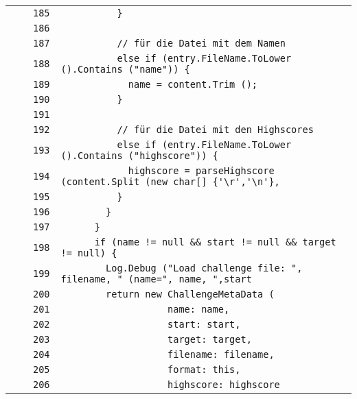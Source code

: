 \documentclass[a4paper,10pt]{article}
\begin{document}
\begin{longtable}[l]{lrrl}
\cellcolor{gray} &  & \verb~185~ & \verb~          }~\\
\cellcolor{gray} &  & \verb~186~ & \verb~~\\
\cellcolor{gray} &  & \verb~187~ & \verb~          // für die Datei mit dem Namen~\\
\cellcolor{gray} &  & \verb~188~ & \verb~          else if (entry.FileName.ToLower ().Contains ("name")) {~\\
\cellcolor{gray} &  & \verb~189~ & \verb~            name = content.Trim ();~\\
\cellcolor{gray} &  & \verb~190~ & \verb~          }~\\
\cellcolor{gray} &  & \verb~191~ & \verb~~\\
\cellcolor{gray} &  & \verb~192~ & \verb~          // für die Datei mit den Highscores~\\
\cellcolor{gray} &  & \verb~193~ & \verb~          else if (entry.FileName.ToLower ().Contains ("highscore")) {~\\
\cellcolor{gray} &  & \verb~194~ & \verb~            highscore = parseHighscore (content.Split (new char[] {'\r','\n'},~\\
\cellcolor{gray} &  & \verb~195~ & \verb~          }~\\
\cellcolor{gray} &  & \verb~196~ & \verb~        }~\\
\cellcolor{gray} &  & \verb~197~ & \verb~      }~\\
\cellcolor{gray} &  & \verb~198~ & \verb~      if (name != null && start != null && target != null) {~\\
\cellcolor{gray} &  & \verb~199~ & \verb~        Log.Debug ("Load challenge file: ", filename, " (name=", name, ",start~\\
\cellcolor{gray} &  & \verb~200~ & \verb~        return new ChallengeMetaData (~\\
\cellcolor{gray} &  & \verb~201~ & \verb~                   name: name,~\\
\cellcolor{gray} &  & \verb~202~ & \verb~                   start: start,~\\
\cellcolor{gray} &  & \verb~203~ & \verb~                   target: target,~\\
\cellcolor{gray} &  & \verb~204~ & \verb~                   filename: filename,~\\
\cellcolor{gray} &  & \verb~205~ & \verb~                   format: this,~\\
\cellcolor{gray} &  & \verb~206~ & \verb~                   highscore: highscore~\\

\end{longtable}
\end{document}
